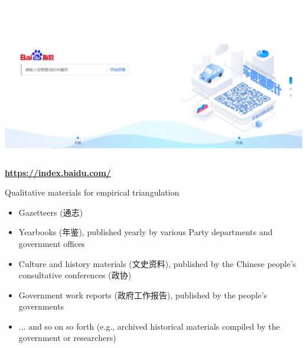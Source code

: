 \documentclass[
  10pt,
  ignorenonframetext,
]{beamer}
\begin{document}
\begin{frame}
\vspace{0.4cm}

\begin{center}\includegraphics[width=0.9\linewidth]{Figs/baidu_crop} \end{center}
\vspace{0.3cm}
\begin{center}
\textbf{\url{https://index.baidu.com/}}
\end{center}
\end{frame}

\begin{frame}{Qualitative materials for empirical triangulation}
\label{qualitative-materials-for-empirical-triangulation}
\begin{itemize}
  \item Gazetteers (通志)
  \vspace{0.2cm}
  \item Yearbooks (年鉴), published yearly by various Party departments and government offices 
  \vspace{0.2cm}
  \item Culture and history materials (文史资料), published by the Chinese people's consultative conferences (政协)
  \vspace{0.2cm}
  \item Government work reports (政府工作报告), published by the people's governments
  \vspace{0.2cm}
  \item ... and so on so forth (e.g., archived historical materials compiled by the government or researchers)
\end{itemize}
\end{frame}
\end{document}
